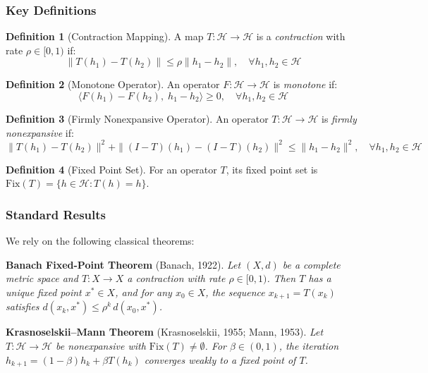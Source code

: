 \documentclass[11pt,a4paper]{article}
\theoremstyle{definition}
\newtheorem{definition}{Definition}
\begin{document}
\subsubsection{Key Definitions}

\begin{definition}[Contraction Mapping]
A map $T : \mathcal{H} \to \mathcal{H}$ is a \textit{contraction} with rate $\rho \in [0, 1)$ if:
\[ \|T(h_1) - T(h_2)\| \leq \rho \|h_1 - h_2\|, \quad \forall h_1, h_2 \in \mathcal{H} \]
\end{definition}

\begin{definition}[Monotone Operator]
An operator $F : \mathcal{H} \to \mathcal{H}$ is \textit{monotone} if:
\[ \langle F(h_1) - F(h_2), \; h_1 - h_2 \rangle \geq 0, \quad \forall h_1, h_2 \in \mathcal{H} \]
\end{definition}

\begin{definition}[Firmly Nonexpansive Operator]
An operator $T : \mathcal{H} \to \mathcal{H}$ is \textit{firmly nonexpansive} if:
\[ \|T(h_1) - T(h_2)\|^2 + \|(I - T)(h_1) - (I - T)(h_2)\|^2 \leq \|h_1 - h_2\|^2, \quad \forall h_1, h_2 \in \mathcal{H} \]
\end{definition}

\begin{definition}[Fixed Point Set]
For an operator $T$, its fixed point set is $\mathrm{Fix}(T) = \{h \in \mathcal{H} : T(h) = h\}$.
\end{definition}

\subsubsection{Standard Results}

We rely on the following classical theorems:

\textbf{Banach Fixed-Point Theorem} (Banach, 1922). \textit{Let $(X, d)$ be a complete metric space and $T : X \to X$ a contraction with rate $\rho \in [0, 1)$. Then $T$ has a unique fixed point $x^* \in X$, and for any $x_0 \in X$, the sequence $x_{k+1} = T(x_k)$ satisfies $d(x_k, x^*) \leq \rho^k \, d(x_0, x^*)$.}

\textbf{Krasnoselskii--Mann Theorem} (Krasnoselskii, 1955; Mann, 1953). \textit{Let $T : \mathcal{H} \to \mathcal{H}$ be nonexpansive with $\mathrm{Fix}(T) \neq \emptyset$. For $\beta \in (0, 1)$, the iteration $h_{k+1} = (1 - \beta) h_k + \beta T(h_k)$ converges weakly to a fixed point of $T$.}
\end{document}

